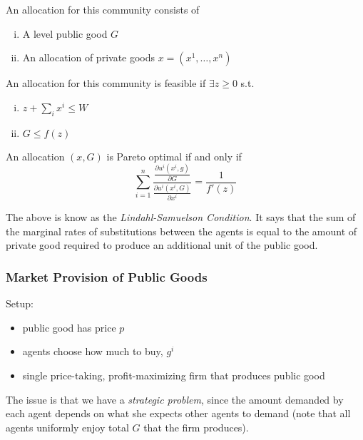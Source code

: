 \begin{definition}[Allocation]
  An allocation for this community consists of
  \begin{enumerate}[(i)]
  \item A level public good $G$
  \item An allocation of private goods $x = (x^1, \dots, x^n)$
  \end{enumerate}
\end{definition}

\begin{definition}[Feasible]
  An allocation for this community is feasible if $\exists z \geq 0$ s.t.
  \begin{enumerate}[(i)]
  \item $z + \sum_i x^i \leq W$
  \item $G \leq f(z)$
  \end{enumerate}
\end{definition}


\begin{definition}
  An allocation $(x, G)$ is Pareto optimal if and only if
  \[
  \sum_{i=1}^n 
  \frac{
    \frac{\partial u^i(x^i, g)}{\partial G}
  } {
    \frac{\partial u^i(x^i, G)}{\partial x^i}
  }
   = \frac{1}{f'(z)}
  \]
\end{definition}

The above is know as the \textit{Lindahl-Samuelson Condition}. It says
that the sum of the marginal rates of substitutions between the agents
is equal to the amount of private good required to produce an
additional unit of the public good.




\subsubsection{Market Provision of Public Goods}

Setup:
\begin{itemize}
\item public good has price $p$
\item agents choose how much to buy, $g^i$
\item single price-taking, profit-maximizing firm that produces public
  good
\end{itemize}

The issue is that we have a \textit{strategic problem}, since the
amount demanded by each agent depends on what she expects other agents
to demand (note that all agents uniformly enjoy total $G$ that the
firm produces).


